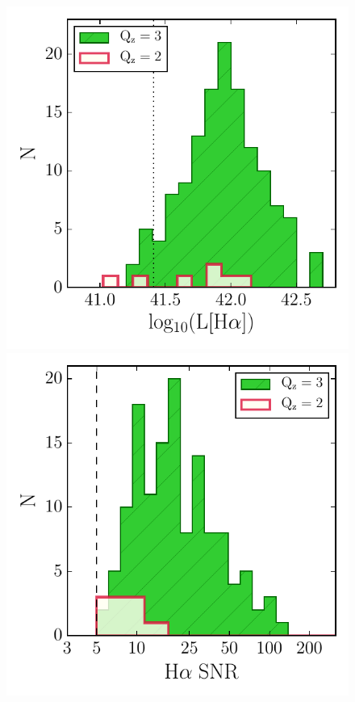 \documentclass[iop]{emulateapj}
\begin{document}
\begin{figure}
\includegraphics[trim = 10 0 5 5, clip, scale=0.6]{figures/Halpha_luminosity.pdf}
\includegraphics[trim = 10 0 5 5, clip, scale=0.6]{figures/Halpha_SNR.pdf}

\end{figure}
\end{document}
